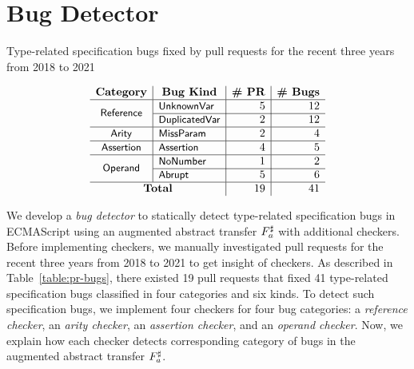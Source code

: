 \section{Bug Detector}\label{sec:checker}

\begin{table}
  \centering
  \caption{Type-related specification bugs fixed by pull requests for the recent
  three years from 2018 to 2021}
  \label{table:pr-bugs}
  \vspace*{-1.5em}
  \[
    \begin{array}{c|l|r|r}
      \multicolumn{1}{c|}{\textbf{Category}} &
      \multicolumn{1}{c|}{\textbf{Bug Kind}} &
      \multicolumn{1}{c|}{\textbf{\# PR}} &
      \multicolumn{1}{c}{\textbf{\# Bugs}}\\
      \hline

      \multirow{2}{*}{\stextsf{\footnotesize Reference}}
      & \stextsf{\footnotesize UnknownVar} & 5 & 12\\\cline{2-4}
      & \stextsf{\footnotesize DuplicatedVar} & 2 & 12\\\hline

      \multirow{1}{*}{\stextsf{\footnotesize Arity}}
      & \stextsf{\footnotesize MissParam} & 2 & 4\\\hline

      \multirow{1}{*}{\stextsf{\footnotesize Assertion}}
      & \stextsf{\footnotesize Assertion} & 4 & 5\\\hline

      \multirow{2}{*}{\stextsf{\footnotesize Operand}}
      & \stextsf{\footnotesize NoNumber} & 1 & 2\\\cline{2-4}
      & \stextsf{\footnotesize Abrupt} & 5 & 6\\\hline

      \multicolumn{2}{c|}{\textbf{Total}} & 19 & 41\\

    \end{array}
  \]
  \vspace*{-1.5em}
\end{table}

We develop a \textit{bug detector} to statically detect type-related
specification bugs in ECMAScript using an augmented abstract transfer
${F}^\sharp_a$ with additional checkers.  Before implementing checkers, we manually
investigated pull requests for the recent three years from 2018 to 2021 to get
insight of checkers.  As described in Table~\ref{table:pr-bugs}, there existed
19 pull requests that fixed 41 type-related specification bugs classified in
four categories and six kinds.  To detect such specification bugs, we implement
four checkers for four bug categories: a \textit{reference checker}, an
\textit{arity checker}, an \textit{assertion checker}, and an \textit{operand
checker}.  Now, we explain how each checker detects corresponding category of
bugs in the augmented abstract transfer ${F}^\sharp_a$.


